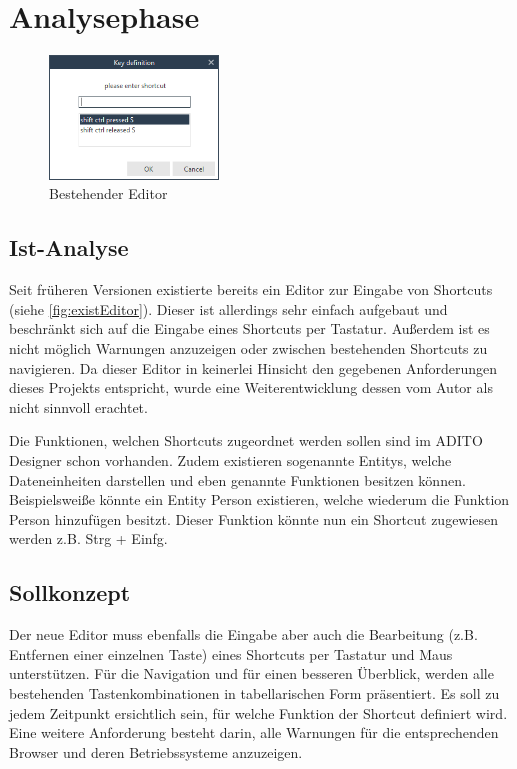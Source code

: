 \section{Analysephase}

\begin{figure}
	\vspace{-12px}
	\centering
	\includegraphics[width=170px]{../graphic/images/screenshots/Alter-Editor}
	\caption{Bestehender Editor}
	\label{fig:existEditor}
\end{figure}

\subsection{Ist-Analyse}

Seit früheren Versionen existierte bereits ein Editor zur Eingabe von Shortcuts (siehe \autoref{fig:existEditor}). Dieser ist allerdings sehr einfach aufgebaut und beschränkt sich auf die Eingabe eines Shortcuts per Tastatur. Außerdem ist es nicht möglich Warnungen anzuzeigen oder zwischen bestehenden Shortcuts zu navigieren. Da dieser Editor in keinerlei Hinsicht den gegebenen Anforderungen dieses Projekts entspricht, wurde eine Weiterentwicklung dessen vom Autor als nicht sinnvoll erachtet.

Die Funktionen, welchen Shortcuts zugeordnet werden sollen sind im ADITO Designer schon vorhanden. Zudem existieren sogenannte Entitys, welche Dateneinheiten darstellen und eben genannte Funktionen besitzen können. Beispielsweiße könnte ein Entity \glqq Person\grqq\xspace existieren, welche wiederum die Funktion \glqq Person hinzufügen\grqq\xspace besitzt. Dieser Funktion könnte nun ein Shortcut zugewiesen werden z.B. Strg + Einfg.

\subsection{Sollkonzept}

Der neue Editor muss ebenfalls die Eingabe aber auch die Bearbeitung (z.B. Entfernen einer einzelnen Taste) eines Shortcuts per Tastatur und Maus unterstützen. Für die Navigation und für einen besseren Überblick, werden alle bestehenden Tastenkombinationen in tabellarischen Form präsentiert. Es soll zu jedem Zeitpunkt ersichtlich sein, für welche Funktion der Shortcut definiert wird. Eine weitere Anforderung besteht darin, alle Warnungen für die entsprechenden Browser und deren Betriebssysteme anzuzeigen.

